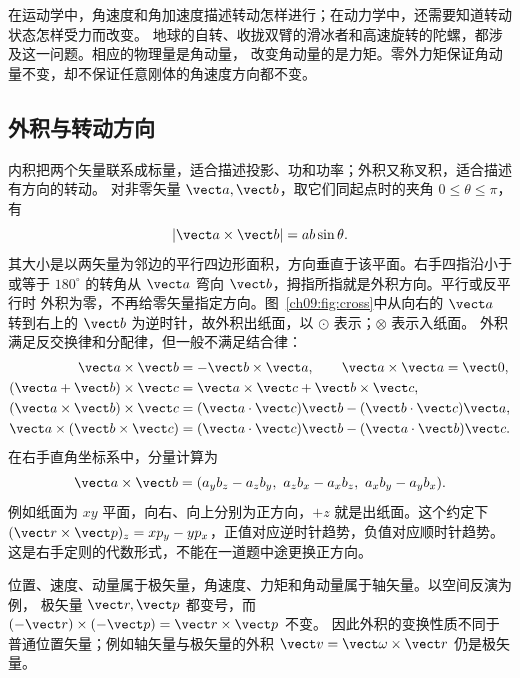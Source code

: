 在运动学中，角速度和角加速度描述转动怎样进行；在动力学中，还需要知道转动状态怎样受力而改变。
地球的自转、收拢双臂的滑冰者和高速旋转的陀螺，都涉及这一问题。相应的物理量是角动量，
改变角动量的是力矩。零外力矩保证角动量不变，却不保证任意刚体的角速度方向都不变。

\subsection{外积与转动方向}
内积把两个矢量联系成标量，适合描述投影、功和功率；外积又称叉积，适合描述有方向的转动。
对非零矢量 $\vect a,\vect b$，取它们同起点时的夹角 $0\le\theta\le\pi$，有
\begin{equation}
 |\vect a\times\vect b|=ab\sin\theta.
\end{equation}
其大小是以两矢量为邻边的平行四边形面积，方向垂直于该平面。右手四指沿小于或等于
$180^\circ$ 的转角从 $\vect a$ 弯向 $\vect b$，拇指所指就是外积方向。平行或反平行时
外积为零，不再给零矢量指定方向。图~\ref{ch09:fig:cross}中从向右的 $\vect a$ 转到右上的
$\vect b$ 为逆时针，故外积出纸面，以 $\odot$ 表示；$\otimes$ 表示入纸面。
\crossProductDiagram
外积满足反交换律和分配律，但一般不满足结合律：
\begin{align}
 \vect a\times\vect b&=-\vect b\times\vect a,\qquad \vect a\times\vect a=\vect0,\\
 (\vect a+\vect b)\times\vect c&=\vect a\times\vect c+\vect b\times\vect c,\\
 (\vect a\times\vect b)\times\vect c&=(\vect a\cdot\vect c)\vect b-(\vect b\cdot\vect c)\vect a,\\
 \vect a\times(\vect b\times\vect c)&=(\vect a\cdot\vect c)\vect b-(\vect a\cdot\vect b)\vect c.
\end{align}
在右手直角坐标系中，分量计算为
\begin{equation}
 \vect a\times\vect b=
 (a_yb_z-a_zb_y,\ a_zb_x-a_xb_z,\ a_xb_y-a_yb_x).
\end{equation}
例如纸面为 $xy$ 平面，向右、向上分别为正方向，$+z$ 就是出纸面。这个约定下
$(\vect r\times\vect p)_z=xp_y-yp_x$，正值对应逆时针趋势，负值对应顺时针趋势。
这是右手定则的代数形式，不能在一道题中途更换正方向。

位置、速度、动量属于极矢量，角速度、力矩和角动量属于轴矢量。以空间反演为例，
极矢量 $\vect r,\vect p$ 都变号，而 $(-\vect r)\times(-\vect p)=\vect r\times\vect p$ 不变。
因此外积的变换性质不同于普通位置矢量；例如轴矢量与极矢量的外积
$\vect v=\vect\omega\times\vect r$ 仍是极矢量。

